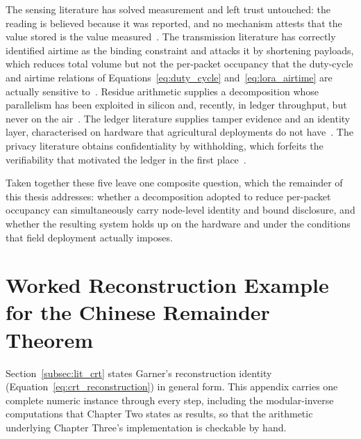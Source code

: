 \documentclass[12pt,a4paper,oneside]{book}
\begin{document}
The sensing literature has solved measurement and left trust untouched: the
reading is believed because it was reported, and no mechanism attests that the
value stored is the value measured~\cite{soussi2024smartsensors,
aydin2021comprehensive}. The transmission literature has correctly identified
airtime as the binding constraint and attacks it by shortening payloads, which
reduces total volume but not the per-packet occupancy that
the duty-cycle and airtime relations of Equations~\ref{eq:duty_cycle}
and~\ref{eq:lora_airtime} are actually sensitive to~\cite{marcelloni2009energy, chen2025compression}. Residue arithmetic
supplies a decomposition whose parallelism has been exploited in silicon and,
recently, in ledger throughput, but never on the
air~\cite{parhami2010computer, luo2023researchapplication,
maiwada2025blockchainscalability}. The ledger literature supplies tamper
evidence and an identity layer, characterised on hardware that agricultural
deployments do not have~\cite{tar2023fabric,
zulkarnain2025performancebenchmarking}. The privacy literature obtains
confidentiality by withholding, which forfeits the verifiability that motivated
the ledger in the first place~\cite{kormiltsyn2023privacyconflict,
yousif2026enablingprivacy}.

Taken together these five leave one composite question, which the remainder of
this thesis addresses: whether a decomposition adopted to reduce per-packet
occupancy can simultaneously carry node-level identity and bound disclosure,
and whether the resulting system holds up on the hardware and under the
conditions that field deployment actually imposes.
\clearpage{}


\backmatter

\begin{singlespace}
\printbibliography[heading=none]
\end{singlespace}

\appendix
\renewcommand{\thechapterword}{\thechapter}
\makeatletter\global\@mainmattertrue\makeatother
\clearpage{}

\chapter{Worked Reconstruction Example for the Chinese Remainder Theorem}
\label{app:crt_worked}

Section~\ref{subsec:lit_crt} states Garner's reconstruction identity
(Equation~\ref{eq:crt_reconstruction}) in general form. This appendix
carries one complete numeric instance through every step, including the
modular-inverse computations that Chapter Two states as results, so that
the arithmetic underlying Chapter Three's implementation is checkable by
hand.
\end{document}

